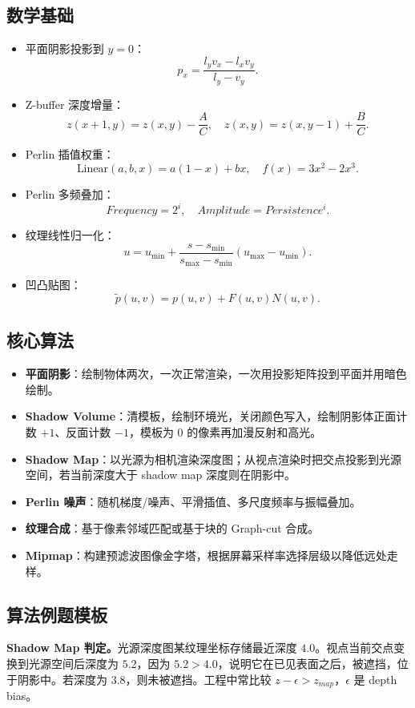 \documentclass[UTF8,zihao=-4,scheme=chinese,fontset=fandol]{ctexart}
\newcommand{\key}[1]{\textbf{#1}}
\begin{document}
\subsection{数学基础}
\begin{itemize}
  \item 平面阴影投影到 $y=0$：
  \[
  p_x=\frac{l_yv_x-l_xv_y}{l_y-v_y}.
  \]
  \item Z-buffer 深度增量：
  \[
  z(x+1,y)=z(x,y)-\frac AC,\quad z(x,y)=z(x,y-1)+\frac BC.
  \]
  \item Perlin 插值权重：
  \[
  \text{Linear}(a,b,x)=a(1-x)+bx,\quad f(x)=3x^2-2x^3.
  \]
  \item Perlin 多频叠加：
  \[
  Frequency=2^i,\quad Amplitude=Persistence^i.
  \]
  \item 纹理线性归一化：
  \[
  u=u_{\min}+\frac{s-s_{\min}}{s_{\max}-s_{\min}}(u_{\max}-u_{\min}).
  \]
  \item 凹凸贴图：
  \[
  \tilde p(u,v)=p(u,v)+F(u,v)N(u,v).
  \]
\end{itemize}

\subsection{核心算法}
\begin{itemize}
  \item \key{平面阴影}：绘制物体两次，一次正常渲染，一次用投影矩阵投到平面并用暗色绘制。
  \item \key{Shadow Volume}：清模板，绘制环境光，关闭颜色写入，绘制阴影体正面计数 $+1$、反面计数 $-1$，模板为 0 的像素再加漫反射和高光。
  \item \key{Shadow Map}：以光源为相机渲染深度图；从视点渲染时把交点投影到光源空间，若当前深度大于 shadow map 深度则在阴影中。
  \item \key{Perlin 噪声}：随机梯度/噪声、平滑插值、多尺度频率与振幅叠加。
  \item \key{纹理合成}：基于像素邻域匹配或基于块的 Graph-cut 合成。
  \item \key{Mipmap}：构建预滤波图像金字塔，根据屏幕采样率选择层级以降低远处走样。
\end{itemize}

\subsection{算法例题模板}
\textbf{Shadow Map 判定。}光源深度图某纹理坐标存储最近深度 $4.0$。视点当前交点变换到光源空间后深度为 $5.2$，因为 $5.2>4.0$，说明它在已见表面之后，被遮挡，位于阴影中。若深度为 $3.8$，则未被遮挡。工程中常比较 $z-\epsilon>z_{map}$，$\epsilon$ 是 depth bias。
\end{document}
